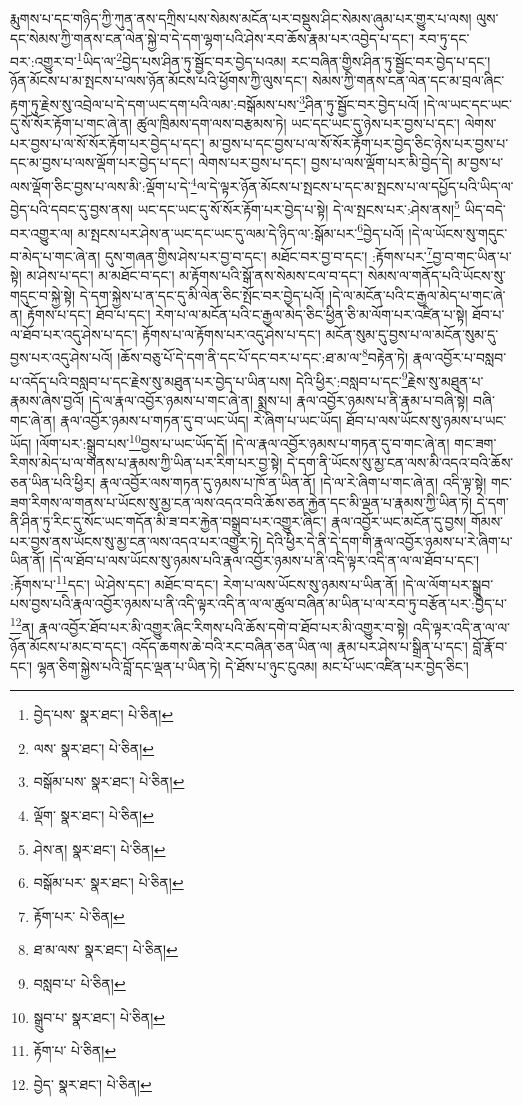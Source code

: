 རྨུགས་པ་དང་གཉིད་ཀྱི་ཀུན་ནས་དཀྲིས་པས་སེམས་མངོན་པར་བསྡུས་ཤིང་སེམས་ཞུམ་པར་གྱུར་པ་ལས། ལུས་དང་སེམས་ཀྱི་གནས་ངན་ལེན་སྐྱེ་བ་དེ་དག་ལྷག་པའི་ཤེས་རབ་ཆོས་རྣམ་པར་འབྱེད་པ་དང་། རབ་ཏུ་དང་བར་:འགྱུར་བ་\footnote{བྱེད་པས་  སྣར་ཐང་།  པེ་ཅིན། }ཡིད་ལ་\footnote{ལས་  སྣར་ཐང་།  པེ་ཅིན། }བྱེད་པས་ཤིན་ཏུ་སྦྱོང་བར་བྱེད་པའམ། རང་བཞིན་གྱིས་ཤིན་ཏུ་སྦྱོང་བར་བྱེད་པ་དང་། ཉོན་མོངས་པ་མ་སྤངས་པ་ལས་ཉོན་མོངས་པའི་ཕྱོགས་ཀྱི་ལུས་དང་། སེམས་ཀྱི་གནས་ངན་ལེན་དང་མ་བྲལ་ཞིང་རྟག་ཏུ་རྗེས་སུ་འབྲེལ་པ་དེ་དག་ཡང་དག་པའི་ལམ་:བསྒོམས་པས་\footnote{བསྒོམ་པས་  སྣར་ཐང་།  པེ་ཅིན། }ཤིན་ཏུ་སྦྱོང་བར་བྱེད་པའོ། །དེ་ལ་ཡང་དང་ཡང་དུ་སོ་སོར་རྟོག་པ་གང་ཞེ་ན། ཚུལ་ཁྲིམས་དག་ལས་བརྩམས་ཏེ། ཡང་དང་ཡང་དུ་ཉེས་པར་བྱས་པ་དང་། ལེགས་པར་བྱས་པ་ལ་སོ་སོར་རྟོག་པར་བྱེད་པ་དང་། མ་བྱས་པ་དང་བྱས་པ་ལ་སོ་སོར་རྟོག་པར་བྱེད་ཅིང་ཉེས་པར་བྱས་པ་དང་མ་བྱས་པ་ལས་ལྡོག་པར་བྱེད་པ་དང་། ལེགས་པར་བྱས་པ་དང་། བྱས་པ་ལས་ལྡོག་པར་མི་བྱེད་དེ། མ་བྱས་པ་ལས་ལྡོག་ཅིང་བྱས་པ་ལས་མི་:ལྡོག་པ་དེ་\footnote{ལྡོག་  སྣར་ཐང་།  པེ་ཅིན། }ལ་དེ་ལྟར་ཉོན་མོངས་པ་སྤངས་པ་དང་མ་སྤངས་པ་ལ་དཔྱོད་པའི་ཡིད་ལ་བྱེད་པའི་དབང་དུ་བྱས་ནས། ཡང་དང་ཡང་དུ་སོ་སོར་རྟོག་པར་བྱེད་པ་སྟེ། དེ་ལ་སྤངས་པར་:ཤེས་ནས།\footnote{ཤེས་ན།  སྣར་ཐང་།  པེ་ཅིན། } ཡིད་བདེ་བར་འགྱུར་ལ། མ་སྤངས་པར་ཤེས་ན་ཡང་དང་ཡང་དུ་ལམ་དེ་ཉིད་ལ་:སྒོམ་པར་\footnote{བསྒོམ་པར་  སྣར་ཐང་།  པེ་ཅིན། }བྱེད་པའོ། །དེ་ལ་ཡོངས་སུ་གདུང་བ་མེད་པ་གང་ཞེ་ན། དུས་གཞན་གྱིས་ཤེས་པར་བྱ་བ་དང་། མཐོང་བར་བྱ་བ་དང་། :རྟོགས་པར་\footnote{རྟོག་པར་  པེ་ཅིན། }བྱ་བ་གང་ཡིན་པ་སྟེ། མ་ཤེས་པ་དང་། མ་མཐོང་བ་དང་། མ་རྟོགས་པའི་སྒོ་ནས་སེམས་ངལ་བ་དང་། སེམས་ལ་གནོད་པའི་ཡོངས་སུ་གདུང་བ་སྐྱེ་སྟེ། དེ་དག་སྐྱེས་པ་ན་དང་དུ་མི་ལེན་ཅིང་སྤོང་བར་བྱེད་པའོ། །དེ་ལ་མངོན་པའི་ང་རྒྱལ་མེད་པ་གང་ཞེ་ན། རྟོགས་པ་དང་། ཐོབ་པ་དང་། རེག་པ་ལ་མངོན་པའི་ང་རྒྱལ་མེད་ཅིང་ཕྱིན་ཅི་མ་ལོག་པར་འཛིན་པ་སྟེ། ཐོབ་པ་ལ་ཐོབ་པར་འདུ་ཤེས་པ་དང་། རྟོགས་པ་ལ་རྟོགས་པར་འདུ་ཤེས་པ་དང་། མངོན་སུམ་དུ་བྱས་པ་ལ་མངོན་སུམ་དུ་བྱས་པར་འདུ་ཤེས་པའོ། །ཆོས་བཅུ་པོ་དེ་དག་ནི་དང་པོ་དང་བར་པ་དང་:ཐ་མ་ལ་\footnote{ཐ་མ་ལས་  སྣར་ཐང་།  པེ་ཅིན། }བརྟེན་ཏེ། རྣལ་འབྱོར་པ་བསླབ་པ་འདོད་པའི་བསླབ་པ་དང་རྗེས་སུ་མཐུན་པར་བྱེད་པ་ཡིན་པས། དེའི་ཕྱིར་:བསླབ་པ་དང་\footnote{བསླབ་པ་  པེ་ཅིན། }རྗེས་སུ་མཐུན་པ་རྣམས་ཞེས་བྱའོ། །དེ་ལ་རྣལ་འབྱོར་ཉམས་པ་གང་ཞེ་ན། སྨྲས་པ། རྣལ་འབྱོར་ཉམས་པ་ནི་རྣམ་པ་བཞི་སྟེ། བཞི་གང་ཞེ་ན། རྣལ་འབྱོར་ཉམས་པ་གཏན་དུ་བ་ཡང་ཡོད། རེ་ཞིག་པ་ཡང་ཡོད། ཐོབ་པ་ལས་ཡོངས་སུ་ཉམས་པ་ཡང་ཡོད། །ལོག་པར་:སྒྲུབ་པས་\footnote{སྒྲུབ་པ་  སྣར་ཐང་།  པེ་ཅིན། }བྱས་པ་ཡང་ཡོད་དོ། །དེ་ལ་རྣལ་འབྱོར་ཉམས་པ་གཏན་དུ་བ་གང་ཞེ་ན། གང་ཟག་རིགས་མེད་པ་ལ་གནས་པ་རྣམས་ཀྱི་ཡིན་པར་རིག་པར་བྱ་སྟེ། དེ་དག་ནི་ཡོངས་སུ་མྱ་ངན་ལས་མི་འདའ་བའི་ཆོས་ཅན་ཡིན་པའི་ཕྱིར། རྣལ་འབྱོར་ལས་གཏན་དུ་ཉམས་པ་ཁོ་ན་ཡིན་ནོ། །དེ་ལ་རེ་ཞིག་པ་གང་ཞེ་ན། འདི་ལྟ་སྟེ། གང་ཟག་རིགས་ལ་གནས་པ་ཡོངས་སུ་མྱ་ངན་ལས་འདའ་བའི་ཆོས་ཅན་རྐྱེན་དང་མི་ལྡན་པ་རྣམས་ཀྱི་ཡིན་ཏེ། དེ་དག་ནི་ཤིན་ཏུ་རིང་དུ་སོང་ཡང་གདོན་མི་ཟ་བར་རྐྱེན་བསྒྲུབ་པར་འགྱུར་ཞིང་། རྣལ་འབྱོར་ཡང་མངོན་དུ་བྱས། གོམས་པར་བྱས་ནས་ཡོངས་སུ་མྱ་ངན་ལས་འདའ་པར་འགྱུར་ཏེ། དེའི་ཕྱིར་དེ་ནི་དེ་དག་གི་རྣལ་འབྱོར་ཉམས་པ་རེ་ཞིག་པ་ཡིན་ནོ། །དེ་ལ་ཐོབ་པ་ལས་ཡོངས་སུ་ཉམས་པའི་རྣལ་འབྱོར་ཉམས་པ་ནི་འདི་ལྟར་འདི་ན་ལ་ལ་ཐོབ་པ་དང་། :རྟོགས་པ་\footnote{རྟོག་པ་  པེ་ཅིན། }དང་། ཡེ་ཤེས་དང་། མཐོང་བ་དང་། རེག་པ་ལས་ཡོངས་སུ་ཉམས་པ་ཡིན་ནོ། །དེ་ལ་ལོག་པར་སྒྲུབ་པས་བྱས་པའི་རྣལ་འབྱོར་ཉམས་པ་ནི་འདི་ལྟར་འདི་ན་ལ་ལ་ཚུལ་བཞིན་མ་ཡིན་པ་ལ་རབ་ཏུ་བརྩོན་པར་:བྱེད་པ་\footnote{བྱེད་  སྣར་ཐང་།  པེ་ཅིན། }ན། རྣལ་འབྱོར་ཐོབ་པར་མི་འགྱུར་ཞིང་རིགས་པའི་ཆོས་དགེ་བ་ཐོབ་པར་མི་འགྱུར་བ་སྟེ། འདི་ལྟར་འདི་ན་ལ་ལ་ཉོན་མོངས་པ་མང་བ་དང་། འདོད་ཆགས་ཆེ་བའི་རང་བཞིན་ཅན་ཡིན་ལ། རྣམ་པར་ཤེས་པ་སྒྲིན་པ་དང་། བློ་རྣོ་བ་དང་། ལྷན་ཅིག་སྐྱེས་པའི་བློ་དང་ལྡན་པ་ཡིན་ཏེ། དེ་ཐོས་པ་ཉུང་ངུའམ། མང་པོ་ཡང་འཛིན་པར་བྱེད་ཅིང་། 